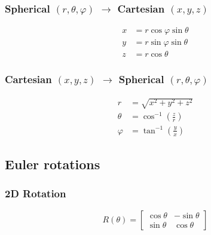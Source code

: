 \documentclass{article}
\newcommand{\phase}{\varphi}
\begin{document}
\subsubsection{Spherical $(r,\theta,\phase)$ $\rightarrow$ Cartesian $(x,y,z)$}
\begin{equation}
    \begin{aligned}
        x &= r \cos\phase\sin\theta \\
        y &= r \sin\phase\sin\theta \\
        z &= r \cos\theta
    \end{aligned}
\end{equation}
\subsubsection{Cartesian $(x,y,z)$ $\rightarrow$ Spherical $(r,\theta,\phase)$}
\begin{equation}
    \begin{aligned}
        r &= \sqrt{x^2+y^2+z^2} \\
        \theta &= \cos^{-1} \left(\frac{z}{r}\right) \\
        \phase &= \tan^{-1} \left(\frac{y}{x}\right)
    \end{aligned}
\end{equation}

\subsection{Euler rotations}

\subsubsection{2D Rotation}
\begin{equation}
    R(\theta) = \begin{bmatrix}
        \cos\theta & -\sin\theta \\
        \sin\theta & \cos\theta
    \end{bmatrix}
\end{equation}
\end{document}
